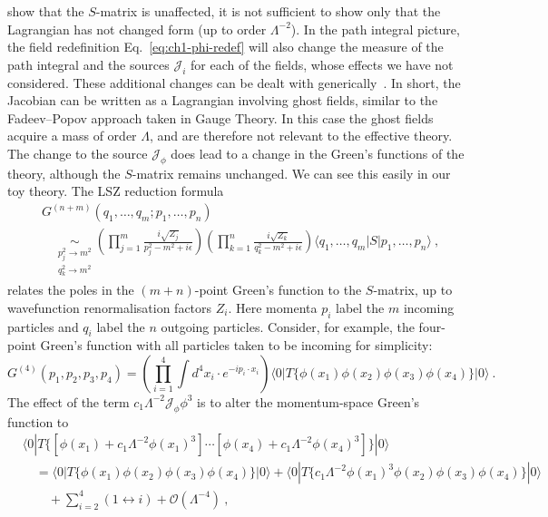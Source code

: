 show that the $S$-matrix is unaffected, it is not sufficient to show only that
the Lagrangian has not changed form (up to order $\Lambda^{-2}$). In the path
integral picture, the field redefinition Eq.~\eqref{eq:ch1-phi-redef} will also
change the measure of the path integral and the sources $\mathcal{J}_{i}$ for
each of the fields, whose effects we have not considered. These additional
changes can be dealt with generically~\cite{Arzt:1993gz}. In short, the Jacobian
can be written as a Lagrangian involving ghost fields, similar to the
Fadeev--Popov approach taken in Gauge Theory. In this case the ghost fields
acquire a mass of order $\Lambda$, and are therefore not relevant to the
effective theory. The change to the source $\mathcal{J}_{\phi}$ does lead to a
change in the Green's functions of the theory, although the $S$-matrix remains
unchanged. We can see this easily in our toy theory. The LSZ reduction
formula~\cite{Lehmann:1954rq}
\begin{equation}
  \begin{aligned}
    &G^{(n+m)}(q_{1}, \ldots, q_{m}; p_{1}, \ldots, p_{n}) \\
    &\quad \underset{\substack{p_{j}^{2} \to m^{2}\\q_{k}^{2} \to m^{2}}}{\sim} \left(\prod_{j=1}^{m} \frac{i \sqrt{Z_{j}}}{p_{j}^{2} - m^{2} + i\epsilon}\right) \left(\prod_{k=1}^{n} \frac{i \sqrt{Z_{k}}}{q_{k}^{2} - m^{2} + i \epsilon}\right) \langle q_{1}, \ldots, q_{m} | S | p_{1}, \ldots, p_{n} \rangle \ ,
  \end{aligned}
\end{equation}
relates the poles in the $(m+n)$-point Green's function to the $S$-matrix, up to
wavefunction renormalisation factors $Z_{i}$. Here momenta $p_{i}$
label the $m$ incoming particles and $q_{i}$ label the $n$ outgoing particles.
Consider, for example, the four-point Green's function with all particles taken
to be incoming for simplicity:
\begin{equation}
  G^{(4)} (p_{1}, p_{2}, p_{3}, p_{4}) = \left( \prod_{i=1}^{4} \int d^{4}x_{i} \cdot e^{-i p_{i} \cdot x_{i}} \right) \langle 0 | T \{ \phi(x_{1}) \phi(x_{2}) \phi(x_{3}) \phi(x_{4}) \} | 0 \rangle \ .
\end{equation}
The effect of the term $c_{1} \Lambda^{-2} \mathcal{J}_{\phi} \phi^{3}$ is to
alter the momentum-space Green's function to
\begin{equation}
  \begin{aligned}
    &\langle 0 | T \{ [\phi(x_{1}) + c_{1}\Lambda^{-2}\phi(x_{1})^{3}] \cdots [\phi(x_{4}) + c_{1}\Lambda^{-2}\phi(x_{4})^{3}] \} | 0 \rangle \\
    &\quad = \langle 0 | T \{ \phi(x_{1}) \phi(x_{2}) \phi(x_{3}) \phi(x_{4}) \} | 0 \rangle + \langle 0 | T \{ c_{1} \Lambda^{-2} \phi(x_{1})^{3} \phi(x_{2}) \phi(x_{3}) \phi(x_{4}) \} | 0 \rangle \\
    &\qquad + \sum_{i=2}^{4} (1 \leftrightarrow i) + \mathcal{O}(\Lambda^{-4}) \ ,
  \end{aligned}
\end{equation}
